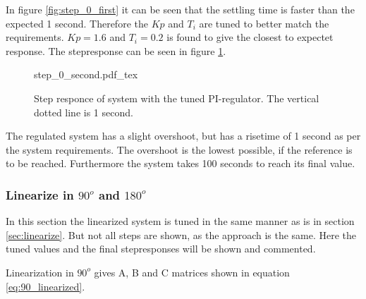 \documentclass[../../../Main]{subfiles}
\begin{document}
In figure \ref{fig:step_0_first} it can be seen that the settling time is faster than the expected 1 second. Therefore the $Kp$ and $T_i$ are tuned to better match the requirements. $Kp = 1.6$ and $T_i=0.2$ is found to give the closest to expectet response. The stepresponse can be seen in figure \ref{fig:step_0_second}.

\begin{figure}[H]
\centering
\def\svgwidth{\textwidth}
{step_0_second.pdf_tex}
\caption{Step responce of system with the tuned PI-regulator. The vertical dotted line is 1 second.}
\label{fig:step_0_second}
\end{figure}

The regulated system has a slight overshoot, but has a risetime of 1 second as per the system requirements. The overshoot is the lowest possible, if the reference is to be reached. Furthermore the system takes 100 seconds to reach its final value.

\subsubsection{Linearize in $90^o$ and $180^o$}
In this section the linearized system is tuned in the same manner as is in section \ref{sec:linearize}. But not all steps are shown, as the approach is the same. Here the tuned values and the final stepresponses will be shown and commented.

Linearization in $90^o$ gives A, B and C matrices shown in equation \ref{eq:90_linearized}. 
\end{document}
